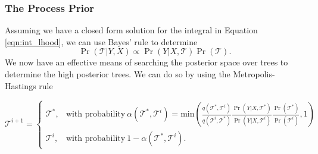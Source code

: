 \subsubsection{The Process Prior}

Assuming we have a closed form solution for the integral in Equation \ref{eqn:int_lhood}, we can use Bayes' rule to determine 
\begin{equation}\label{eqn:tree_post}
\Pr(\mathcal{T} \vert Y , X) \propto \Pr(Y \vert X ,\mathcal{T})\Pr(\mathcal{T}).
\end{equation} 
We now have an effective means of searching the posterior space over trees to determine the high posterior trees. We can do so by using the Metropolis-Hastings rule 

\begin{equation}\label{eqn:MHrule}
\mathcal{T}^{i+1} =\begin{cases}
\mathcal{T}^*, & \text{with probability}\ \alpha(\mathcal{T}^*, \mathcal{T}^i) = \text{min}\left(\frac{q(\mathcal{T}^*, \mathcal{T}^i)}{q(\mathcal{T}^i, \mathcal{T}^*)}\frac{\Pr(Y\vert X, \mathcal{T}^*)}{\Pr(Y\vert X,\mathcal{T}^i)}\frac{\Pr(\mathcal{T}^{*})}{\Pr(\mathcal{T}^i)},1 \right) \\
\mathcal{T}^{i}, & \text{with probability}\ 1-\alpha(\mathcal{T}^*, \mathcal{T}^i).
\end{cases} \end{equation}

